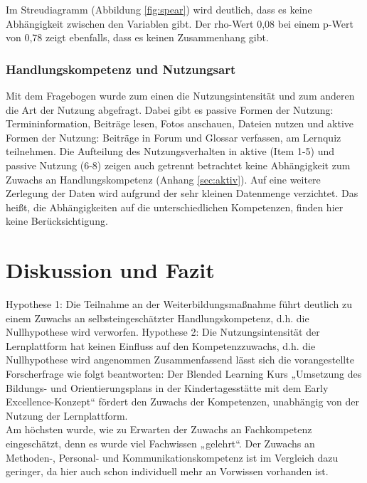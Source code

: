 \documentclass[12pt,smallheadings, bibliography=totoc]{scrartcl}
\begin{document}
Im Streudiagramm (Abbildung \ref{fig:spear}) wird deutlich, dass es
keine Abhängigkeit zwischen den Variablen gibt. Der rho-Wert 0,08 bei
einem p-Wert von 0,78 zeigt ebenfalls, dass es keinen Zusammenhang gibt.

\subsubsection{Handlungskompetenz und
Nutzungsart}\label{handlungskompetenz-und-nutzungsart}

Mit dem Fragebogen wurde zum einen die Nutzungsintensität und zum
anderen die Art der Nutzung abgefragt. Dabei gibt es passive Formen der
Nutzung: Termininformation, Beiträge lesen, Fotos anschauen, Dateien
nutzen und aktive Formen der Nutzung: Beiträge in Forum und Glossar
verfassen, am Lernquiz teilnehmen. Die Aufteilung des Nutzungsverhalten
in aktive (Item 1-5) und passive Nutzung (6-8) zeigen auch getrennt
betrachtet keine Abhängigkeit zum Zuwachs an Handlungskompetenz (Anhang
\ref{sec:aktiv}). Auf eine weitere Zerlegung der Daten wird aufgrund der
sehr kleinen Datenmenge verzichtet. Das heißt, die Abhängigkeiten auf
die unterschiedlichen Kompetenzen, finden hier keine Berücksichtigung.

\section{Diskussion und Fazit}\label{diskussion-und-fazit}

Hypothese 1: Die Teilnahme an der Weiterbildungsmaßnahme führt deutlich
zu einem Zuwachs an selbsteingeschätzter Handlungskompetenz, d.h. die
Nullhypothese wird verworfen. Hypothese 2: Die Nutzungsintensität der
Lernplattform hat keinen Einfluss auf den Kompetenzzuwachs, d.h. die
Nullhypothese wird angenommen Zusammenfassend lässt sich die
vorangestellte Forscherfrage wie folgt beantworten: Der Blended Learning
Kurs „Umsetzung des Bildungs- und Orientierungsplans in der
Kindertagesstätte mit dem Early Excellence-Konzept`` fördert den Zuwachs
der Kompetenzen, unabhängig von der Nutzung der Lernplattform.\\
Am höchsten wurde, wie zu Erwarten der Zuwachs an Fachkompetenz
eingeschätzt, denn es wurde viel Fachwissen „gelehrt``. Der Zuwachs an
Methoden-, Personal- und Kommunikationskompetenz ist im Vergleich dazu
geringer, da hier auch schon individuell mehr an Vorwissen vorhanden
ist.
\end{document}
